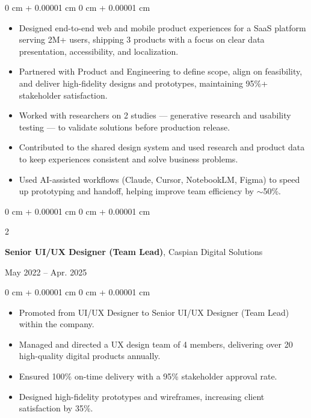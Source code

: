 \documentclass[10pt, letterpaper]{article}
\newenvironment{highlights}{
    \begin{itemize}[
        topsep=0.08 cm,
        parsep=0.10 cm,
        partopsep=0pt,
        itemsep=0.04 cm,
        leftmargin=0 cm + 10pt
    ]
}{
    \end{itemize}
} %
\newenvironment{onecolentry}{
    \begin{adjustwidth}{
        0 cm + 0.00001 cm
    }{
        0 cm + 0.00001 cm
    }
}{
    \end{adjustwidth}
} %
\newenvironment{twocolentry}[2][]{
    \onecolentry
    \def\secondColumn{#2}
    \setcolumnwidth{\fill, 4.5 cm}
    \begin{paracol}{2}
}{
    \switchcolumn \raggedleft \secondColumn
    \end{paracol}
    \endonecolentry
} %
\begin{document}
\vspace{0.14 cm}
\begin{onecolentry}
\begin{highlights}
    \item Designed end-to-end web and mobile product experiences for a SaaS platform serving 2M+ users, shipping 3 products with a focus on clear data presentation, accessibility, and localization.

    \item Partnered with Product and Engineering to define scope, align on feasibility, and deliver high-fidelity designs and prototypes, maintaining 95\%+ stakeholder satisfaction.

    \item Worked with researchers on 2 studies --- generative research and usability testing --- to validate solutions before production release.

    \item Contributed to the shared design system and used research and product data to keep experiences consistent and solve business problems.

    \item Used AI-assisted workflows (Claude, Cursor, NotebookLM, Figma) to speed up prototyping and handoff, helping improve team efficiency by $\sim$50\%.
\end{highlights}
\end{onecolentry}

\vspace{0.48 cm}

\begin{twocolentry}{May 2022 -- Apr. 2025}
    \textbf{Senior UI/UX Designer (Team Lead)}, Caspian Digital Solutions
\end{twocolentry}

\vspace{0.14 cm}
\begin{onecolentry}
    \begin{highlights}
        \item Promoted from UI/UX Designer to Senior UI/UX Designer (Team Lead) within the company.
        \item Managed and directed a UX design team of 4 members, delivering over 20 high-quality digital products annually.
        \item Ensured 100\% on-time delivery with a 95\% stakeholder approval rate.
        \item Designed high-fidelity prototypes and wireframes, increasing client satisfaction by 35\%.
    \end{highlights}
\end{onecolentry}
\end{document}
